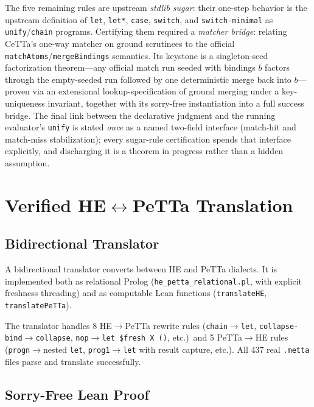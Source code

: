 \documentclass[11pt]{article}
\newcommand{\code}[1]{\texttt{#1}}
\newcommand{\PeTTa}{\textup{PeTTa}}
\newcommand{\HE}{\textup{HE}}
\newcommand{\CeTTa}{\textup{CeTTa}}
\begin{document}
The five remaining rules are upstream \emph{stdlib sugar}: their
one-step behavior is the upstream definition of \code{let},
\code{let*}, \code{case}, \code{switch}, and \code{switch-minimal} as
\code{unify}/\code{chain} programs.  Certifying them required a
\emph{matcher bridge}: relating \CeTTa{}'s one-way matcher on ground
scrutinees to the official \code{matchAtoms}/\code{mergeBindings}
semantics.  Its keystone is a singleton-seed factorization
theorem---any official match run seeded with bindings $b$ factors
through the empty-seeded run followed by one deterministic merge back
into $b$---proven via an extensional lookup-specification of ground
merging under a key-uniqueness invariant, together with its
sorry-free instantiation into a full success bridge.  The final link
between the declarative judgment and the running evaluator's
\code{unify} is stated \emph{once} as a named two-field interface
(match-hit and match-miss stabilization); every sugar-rule
certification spends that interface explicitly, and discharging it is
a theorem in progress rather than a hidden assumption.

\section{Verified \HE{}$\leftrightarrow$\PeTTa{} Translation}

\subsection{Bidirectional Translator}

A bidirectional translator converts between \HE{} and \PeTTa{} dialects.
It is implemented both as relational Prolog
(\code{he\_petta\_relational.pl}, with explicit freshness threading) and
as computable Lean functions (\code{translateHE}, \code{translatePeTTa}).

The translator handles 8 \HE{}$\to$\PeTTa{} rewrite rules
(\code{chain}$\to$\code{let}, \code{collapse-bind}$\to$\code{collapse},
\code{nop}$\to$\code{let~\$fresh~X~()}, etc.)\ and 5
\PeTTa{}$\to$\HE{} rules (\code{progn}$\to$nested \code{let},
\code{prog1}$\to$\code{let} with result capture, etc.).  All 437 real
\code{.metta} files parse and translate successfully.

\subsection{Sorry-Free Lean Proof}
\end{document}
